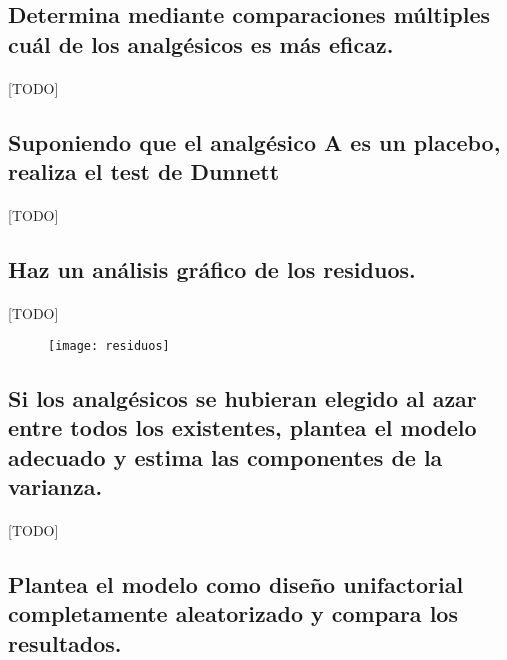 \documentclass[11pt]{article}
\begin{document}
    \subsection{Determina mediante comparaciones múltiples cuál de los analgésicos es más eficaz.}

      \paragraph{}
      [TODO]

    \subsection{Suponiendo que el analgésico A es un placebo, realiza el test de Dunnett}

      \paragraph{}
      [TODO]

    \subsection{Haz un análisis gráfico de los residuos.}

      \paragraph{}
      [TODO]

      \begin{figure}[H]
        \centering
        \texttt{[image: residuos]}
        \caption{}
        \label{}
      \end{figure}

    \subsection{Si los analgésicos se hubieran elegido al azar entre todos los existentes, plantea el modelo adecuado y estima las componentes de la varianza.}

      \paragraph{}
      [TODO]


    \subsection{Plantea el modelo como diseño unifactorial completamente aleatorizado y compara los resultados.}
\end{document}
